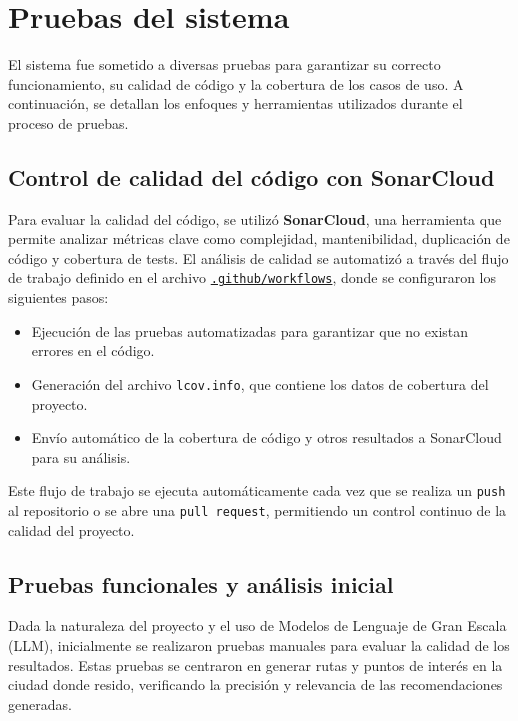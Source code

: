 \section{Pruebas del sistema}

El sistema fue sometido a diversas pruebas para garantizar su correcto funcionamiento, su calidad de código y la cobertura de los casos de uso. A continuación, se detallan los enfoques y herramientas utilizados durante el proceso de pruebas.

\subsection{Control de calidad del código con SonarCloud}

Para evaluar la calidad del código, se utilizó \textbf{SonarCloud}, una herramienta que permite analizar métricas clave como complejidad, mantenibilidad, duplicación de código y cobertura de tests. El análisis de calidad se automatizó a través del flujo de trabajo definido en el archivo \href{https://github.com/fps1001/TFGII_FPisot/tree/main/.github/workflows}{\texttt{.github/workflows}}, donde se configuraron los siguientes pasos:
\begin{itemize}
	\item Ejecución de las pruebas automatizadas para garantizar que no existan errores en el código.
	\item Generación del archivo \texttt{lcov.info}, que contiene los datos de cobertura del proyecto.
	\item Envío automático de la cobertura de código y otros resultados a SonarCloud para su análisis.
\end{itemize}

Este flujo de trabajo se ejecuta automáticamente cada vez que se realiza un \texttt{push} al repositorio o se abre una \texttt{pull request}, permitiendo un control continuo de la calidad del proyecto.


\subsection{Pruebas funcionales y análisis inicial}

Dada la naturaleza del proyecto y el uso de Modelos de Lenguaje de Gran Escala (LLM), inicialmente se realizaron pruebas manuales para evaluar la calidad de los resultados. Estas pruebas se centraron en generar rutas y puntos de interés en la ciudad donde resido, verificando la precisión y relevancia de las recomendaciones generadas.

